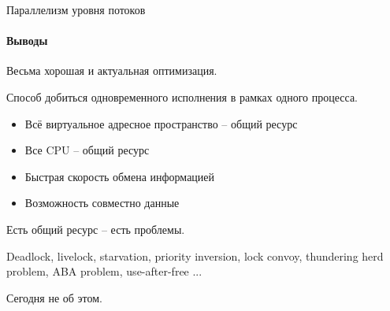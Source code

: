 \begin{frame}{Параллелизм уровня потоков}
\framesubtitle{Выводы}

  Весьма хорошая и актуальная оптимизация.

  \pause
  Способ добиться одновременного исполнения в рамках одного процесса.

  \begin{itemize}
    \pause
    \item Всё виртуальное адресное пространство -- общий ресурс

    \pause
    \item Все CPU -- общий ресурс

    \pause
    \item Быстрая скорость обмена информацией

    \pause
    \item Возможность совместно  данные
  \end{itemize}

  \pause
  Есть общий ресурс -- есть проблемы.

  Deadlock, livelock, starvation, priority inversion, lock convoy, thundering herd problem, ABA problem, use-after-free ...

  \pause
  Сегодня не об этом.

  \pause

\end{frame}




